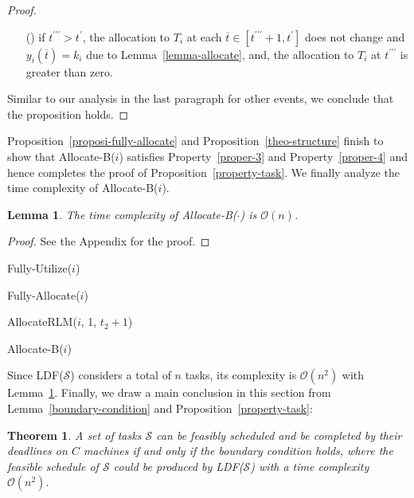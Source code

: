 \documentclass[10pt,journal,compsoc]{IEEEtran}
\newtheorem{theorem}{\textbf{Theorem}}\newtheorem{definition}{\textbf{Definition}}\newtheorem{feature}{Feature}\newtheorem{proposition}{\textbf{Proposition}}\newtheorem{lemma}{Lemma}\newtheorem{assumption}{Assumption}\newtheorem{principle}{\textbf{Principle}}\newtheorem{observation}{\textbf{{\em Observation}}}\newtheorem{property}{\textbf{{\em Property}}}
\newcommand{\rmnum}[1]{\romannumeral #1}
\begin{document}
\begin{proof}
\begin{enumerate}
\item [(\rmnum{3})] if $t^{\prime\prime\prime} > t^{\prime}$, the allocation to $T_{i}$ at each $\overline{t}\in[t^{\prime\prime\prime}+1, t^{\prime}]$ does not change and $y_{i}(\overline{t})=k_{i}$ due to Lemma~\ref{lemma-allocate}, and, the allocation to $T_{i}$ at $t^{\prime\prime\prime}$ is greater than zero.\end{enumerate}
Similar to our analysis in the last paragraph for other events, we conclude that the proposition holds.
\end{proof}





Proposition~\ref{proposi-fully-allocate} and Proposition~\ref{theo-structure} finish to show that Allocate-B($i$) satisfies Property~\ref{proper-3} and Property~\ref{proper-4} and hence completes the proof of Proposition~\ref{property-task}. We finally analyze the time complexity of Allocate-B($i$).


\begin{lemma}\label{lemma-complexity}
The time complexity of Allocate-B($\cdot$) is $\mathcal{O}(n)$.
\end{lemma}
\begin{proof}
See the Appendix for the proof.
\end{proof}




\begin{algorithm}[!ht]

Fully-Utilize($i$)\;

Fully-Allocate($i$)\;

AllocateRLM($i$, 1, $t_{2}+1$)\;

\caption{Allocate-B($i$)\label{Allocate-B}}
\end{algorithm}



Since LDF($\mathcal{S}$) considers a total of $n$ tasks, its complexity is $\mathcal{O}(n^{2})$ with Lemma~\ref{lemma-complexity}. Finally, we draw a main conclusion in this section from Lemma~\ref{boundary-condition} and Proposition~\ref{property-task}:

\begin{theorem}\label{main-theorem}
A set of tasks $\mathcal{S}$ can be feasibly scheduled and be completed by their deadlines on $C$ machines {\em if and only if} the boundary condition holds, where the feasible schedule of $\mathcal{S}$ could be produced by LDF($\mathcal{S}$) with a time complexity $\mathcal{O}(n^{2})$.
\end{theorem}
\end{document}

